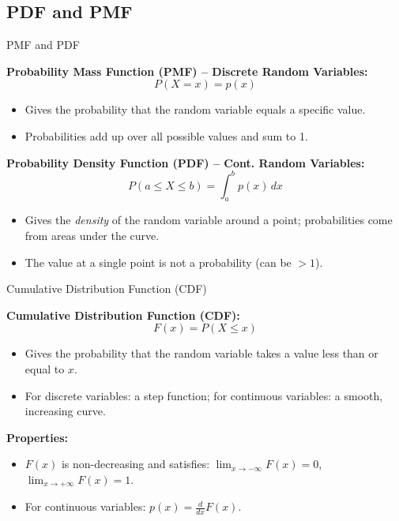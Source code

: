 \documentclass{beamer}
\begin{document}
\subsection{PDF and PMF}

\begin{frame}{PMF and PDF}

\textbf{Probability Mass Function (PMF) -- Discrete Random Variables:}
\[
P(X = x) = p(x)
\]
\begin{itemize}
  \item Gives the probability that the random variable equals a specific value.
  \item Probabilities add up over all possible values and sum to 1.
\end{itemize}

\vspace{1em}

\textbf{Probability Density Function (PDF) -- Cont. Random Variables:}
\[
P(a \leq X \leq b) = \int_a^b p(x) \, dx
\]
\begin{itemize}
  \item Gives the \textit{density} of the random variable around a point; probabilities come from areas under the curve.
  \item The value at a single point is not a probability (can be $>1$).
\end{itemize}

\end{frame}


\begin{frame}{Cumulative Distribution Function (CDF)}

\textbf{Cumulative Distribution Function (CDF):}
\[
F(x) = P(X \leq x)
\]
\begin{itemize}
  \item Gives the probability that the random variable takes a value less than or equal to $x$.
  \item For discrete variables: a step function; for continuous variables: a smooth, increasing curve.
\end{itemize}

\vspace{1em}

\textbf{Properties:}
\begin{itemize}
  \item $F(x)$ is non-decreasing and satisfies: $\lim_{x \to -\infty} F(x) = 0$, $\lim_{x \to +\infty} F(x) = 1$.
  \item For continuous variables: $p(x) = \frac{d}{dx} F(x)$.
\end{itemize}

\end{frame}
\end{document}
